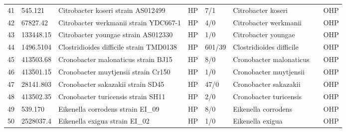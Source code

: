 \begin{longtable}{llllllll}
41  &       545.121 &                                       Citrobacter koseri strain AS012499 &    HP &       7/1 &                             Citrobacter koseri &                                    \cite{yuan2019comparative} &   OHP \\
42  &      67827.42 &                                    Citrobacter werkmanii strain YDC667-1 &    HP &       4/0 &                          Citrobacter werkmanii &                                    \cite{yuan2019comparative} &   OHP \\
43  &     133448.15 &                                      Citrobacter youngae strain AS012330 &    HP &       1/0 &                            Citrobacter youngae &                                    \cite{yuan2019comparative} &   OHP \\
44  &     1496.5104 &                                  Clostridioides difficile strain TMD0138 &    HP &    601/39 &                       Clostridioides difficile &                  \cite{goudarzi2014clostridium,usui2020draft} &   OHP \\
45  &     413503.68 &                                      Cronobacter malonaticus strain BJ15 &    HP &       8/0 &                        Cronobacter malonaticus &                                      \cite{singh2015insights} &   OHP \\
46  &     413501.15 &                                      Cronobacter muytjensii strain Cr150 &    HP &       1/0 &                         Cronobacter muytjensii &                                      \cite{singh2015insights} &   OHP \\
47  &     28141.803 &                                        Cronobacter sakazakii strain SD45 &    HP &      47/0 &                          Cronobacter sakazakii &                                      \cite{singh2015insights} &   OHP \\
48  &     413502.35 &                                       Cronobacter turicensis strain SH11 &    HP &       2/0 &                         Cronobacter turicensis &                                      \cite{singh2015insights} &   OHP \\
49  &       539.170 &                                        Eikenella corrodens strain EI\_09 &    HP &       8/0 &                            Eikenella corrodens &                             \cite{hombach2007urinary,539.170} &   OHP \\
50  &     2528037.4 &                                           Eikenella exigua strain EI\_02 &    HP &       1/0 &                               Eikenella exigua &                 \cite{hombach2007urinary,stormo2020eikenella} &   OHP \\

\end{longtable}
